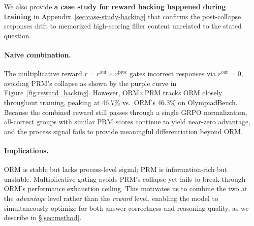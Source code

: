 We also provide \textbf{a case study for reward hacking happened during training} in Appendix~\ref{sec:case-study-hacking} that confirms the post-collapse responses drift to memorized high-scoring filler content unrelated to the stated question.

\paragraph{Naive combination.} The multiplicative reward $r = r^{\text{out}} \times r^{\text{proc}}$ gates incorrect responses via $r^{\text{out}} = 0$, avoiding PRM's collapse as shown by the purple curve in Figure~\ref{fig:reward_hacking}. However, ORM$\times$PRM tracks ORM closely throughout training, peaking at 46.7\% vs.\ ORM's 46.3\% on OlympiadBench. Because the combined reward still passes through a single GRPO normalization, all-correct groups with similar PRM scores continue to yield near-zero advantage, and the process signal fails to provide meaningful differentiation beyond ORM.

\paragraph{Implications.} ORM is stable but lacks process-level signal; PRM is information-rich but unstable. Multiplicative gating avoids PRM's collapse yet fails to break through ORM's performance exhaustion ceiling. This motivates us to combine the two at the \emph{advantage} level rather than the \emph{reward} level, enabling the model to simultaneously optimize for both answer correctness and reasoning quality, as we describe in \S\ref{sec:method}.
